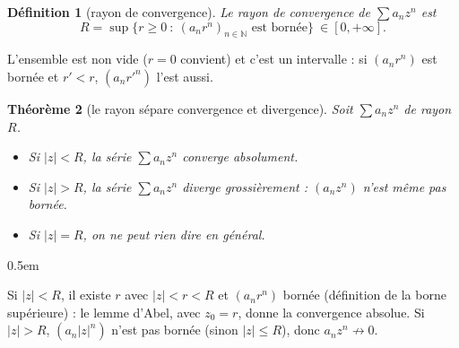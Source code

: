 \documentclass[a4paper,11pt]{article}
\makeatletter
\numberwithin{equation}{section}
\numberwithin{figure}{section}
\numberwithin{table}{section}
\theoremstyle{enonce}
\newtheorem{definition}{Définition}[section]
\newtheorem{theoreme}[definition]{Théorème}
\theoremstyle{exemple}
\theoremstyle{remarque}
\renewcommand{\proofname}{Démonstration}
\renewenvironment{proof}[1][\proofname]{\par\pushQED{\qed}\normalfont
  \topsep0.5em\relax\trivlist\item[\hskip\labelsep\sffamily\itshape\color{Gris}#1.]\ignorespaces}
  {\popQED\endtrivlist\@endpefalse}
\newcommand{\N}{\mathbb{N}}
\makeatother
\begin{document}
\begin{definition}[rayon de convergence]
Le \emph{rayon de convergence} de $\sum a_nz^n$ est
\[R=\sup\big\{r\geq0\ :\ (a_nr^n)_{n\in\N}\text{ est bornée}\big\}\ \in[0,+\infty].\]
\end{definition}

L'ensemble est non vide ($r=0$ convient) et c'est un intervalle : si $(a_nr^n)$ est bornée et $r'<r$, $(a_nr'^n)$ l'est aussi.

\begin{theoreme}[le rayon sépare convergence et divergence]\label{t:rayon}
Soit $\sum a_nz^n$ de rayon $R$.
\begin{itemize}
\item Si $|z|<R$, la série $\sum a_nz^n$ converge \emph{absolument}.
\item Si $|z|>R$, la série $\sum a_nz^n$ diverge \emph{grossièrement} : $(a_nz^n)$ n'est même pas bornée.
\item Si $|z|=R$, on ne peut rien dire en général.
\end{itemize}
\end{theoreme}

\begin{proof}
Si $|z|<R$, il existe $r$ avec $|z|<r<R$ et $(a_nr^n)$ bornée (définition de la borne supérieure) : le lemme d'Abel, avec
$z_0=r$, donne la convergence absolue. Si $|z|>R$, $(a_n|z|^n)$ n'est pas bornée (sinon $|z|\leq R$), donc $a_nz^n\not\to0$.
\end{proof}
\end{document}
